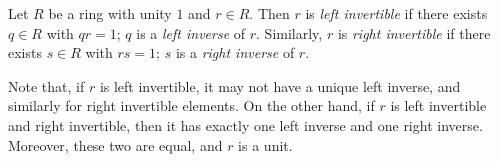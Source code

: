 \documentclass[12pt]{article}
\begin{document}
Let $R$ be a ring with unity $1$ and $r \in R$.  Then $r$ is \emph{left invertible} if there exists $q \in R$ with $qr=1$; $q$ is a \emph{left inverse} of $r$.  Similarly, $r$ is \emph{right invertible} if there exists $s \in R$ with $rs=1$; $s$ is a \emph{right inverse} of $r$.

Note that, if $r$ is left invertible, it may not have a unique left inverse, and similarly for right invertible elements.  On the other hand, if $r$ is left invertible and right invertible, then it has exactly one left inverse and one right inverse.  Moreover, these two  are equal, and $r$ is a unit.
\end{document}
